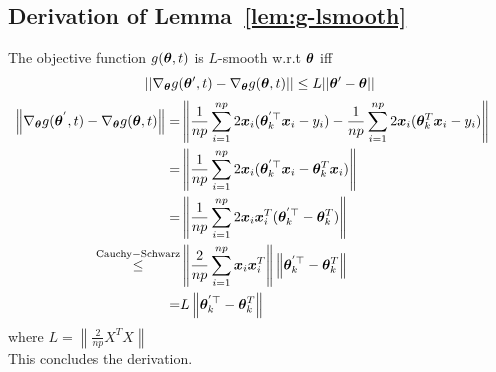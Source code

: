 \documentclass{article} %
\newcommand{\norm}[1]{\left\lVert#1\right\rVert}
\begin{document}
\begin{appendices}
	\subsection{Derivation of Lemma~\ref{lem:g-lsmooth}}
	The objective function 
	$\displaystyle g({\bm{\theta}},t)$ is $L$-smooth w.r.t ${\bm{\theta}}$ iff
	\begin{equation}
		||  \nabla_{\bm{\theta}} g({\bm{\theta}}',t) - \nabla_{\bm{\theta}} g({\bm{\theta}},t) || \leq L|| {\bm{\theta}}' - {\bm{\theta}} || 
	\end{equation}
	\begin{align}
		\norm{ \nabla_{\vtheta} g(\vtheta^{'},t) - \nabla_{\vtheta} g(\vtheta,t) } = &\norm{ \frac{1}{np}\sum_{i=1}^{np}2\vx_i(\vtheta_k^{'\top} \vx_i - y_i) - \frac{1}{np}\sum_{i=1}^{np}2\vx_i(\vtheta_k^T \vx_i - y_i) } &&\\
		= &\norm{\frac{1}{np}\sum_{i=1}^{np}2\vx_i(\vtheta_k^{'\top}\vx_i - \vtheta_k^T\vx_i)}&&\\
		= &\norm{\frac{1}{np}\sum_{i=1}^{np}2\vx_i\vx_i^T(\vtheta_k^{'\top} - \vtheta_k^T)} &&\\
		\overset{\mathrm{Cauchy-Schwarz}}{\leq} &\norm{\frac{2}{np}\sum_{i=1}^{np}\vx_i\vx_i^T}\norm{\vtheta_k^{'\top} - \vtheta_k^T} &&\\
		= &L\norm{\vtheta_k^{'\top} - \vtheta_k^T} &&
	\end{align}
	where $\displaystyle L = \norm{\frac{2}{np}X^T X}$\\
	This concludes the derivation.

\end{appendices}
\end{document}
